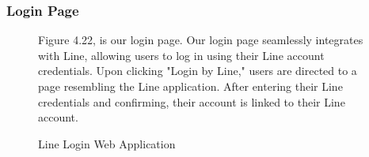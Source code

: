 \documentclass[12pt,oneside,openright,a4paper]{cpe-english-project}
\begin{document}
        \subsubsection{Login Page}
          \begin{figure}[!h]
            \centering
            \begin{minipage}{.5\textwidth}
              \centering
            \end{minipage}%
            \begin{minipage}{.5\textwidth}
              \centering
            \end{minipage}%
          
            \caption{Line Login Web Application}\label{fig:WebAppLineLogin}
            \begin{flushleft}
              \qquad Figure 4.22, is our login page. Our login page seamlessly integrates with Line, allowing users to log in using their Line account credentials. Upon clicking "Login by Line," users are directed to a page resembling the Line application. After entering their Line credentials and confirming, their account is linked to their Line account.\par
            \end{flushleft}
          \end{figure}
\end{document}
